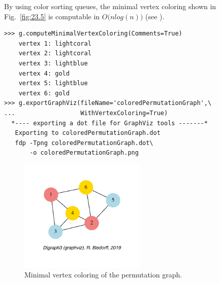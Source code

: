 By using color sorting queues, the minimal vertex coloring shown in Fig.~\vref{fig:23.5} is computable in $O\big(n log(n)\big)$ (see \citet{GOL-2004}).
\begin{lstlisting}
>>> g.computeMinimalVertexColoring(Comments=True)
    vertex 1: lightcoral
    vertex 2: lightcoral
    vertex 3: lightblue
    vertex 4: gold
    vertex 5: lightblue
    vertex 6: gold
>>> g.exportGraphViz(fileName='coloredPermutationGraph',\
...                  WithVertexColoring=True)
  *---- exporting a dot file for GraphViz tools -------*
   Exporting to coloredPermutationGraph.dot
   fdp -Tpng coloredPermutationGraph.dot\
       -o coloredPermutationGraph.png
\end{lstlisting}
\begin{figure}[h]
\sidecaption[t]
\includegraphics[width=6cm]{Figures/23-5-coloredPermutationGraph.pdf}
\caption{Minimal vertex coloring of the permutation graph.} 
\label{fig:23.5}       %
\end{figure}

